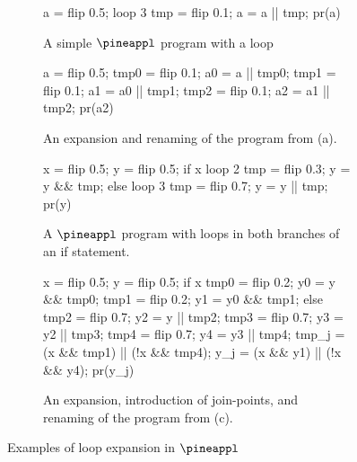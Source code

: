 \begin{figure}
  \begin{subfigure}[t]{0.45\textwidth}
    \begin{pineapplcodeblock}
      a = flip 0.5;
      loop 3 {
        tmp = flip 0.1;
        a = a || tmp; 
      }
      pr(a)
    \end{pineapplcodeblock}
    \caption{A simple $\pineappl$ program with a loop}
    \label{fig:loop-pineappl-sugar}
  \end{subfigure}
  \begin{subfigure}[t]{0.45\textwidth}
    \begin{pineapplcodeblock}
      a = flip 0.5;
      tmp0 = flip 0.1;
      a0 = a || tmp0; 
      tmp1 = flip 0.1;
      a1 = a0 || tmp1;
      tmp2 = flip 0.1;
      a2 = a1 || tmp2;
      pr(a2)
    \end{pineapplcodeblock}
    \caption{An expansion and renaming of the program from (a).}
    \label{fig:loop-pineappl-desugar}
  \end{subfigure}
  \begin{subfigure}[t]{0.45\textwidth}
    \begin{pineapplcodeblock}
      x = flip 0.5;
      y = flip 0.5;
      if x {
        loop 2 {
          tmp = flip 0.3;
          y = y && tmp;
        }
      }
      else {
        loop 3 {
          tmp = flip 0.7;
          y = y || tmp; 
        }
      }
      pr(y)
    \end{pineapplcodeblock}
    \caption{A $\pineappl$ program with loops in both branches of an if statement.}
    \label{fig:loop-pineappl-ite-sugar}
  \end{subfigure}
  \begin{subfigure}[t]{0.45\textwidth}
    \begin{pineapplcodeblock}
      x = flip 0.5;
      y = flip 0.5;
      if x {
        tmp0 = flip 0.2;
        y0 = y && tmp0;
        tmp1 = flip 0.2;
        y1 = y0 && tmp1;
      }
      else {
        tmp2 = flip 0.7;
        y2 = y || tmp2;
        tmp3 = flip 0.7;
        y3 = y2 || tmp3;
        tmp4 = flip 0.7;
        y4 = y3 || tmp4;
      }
      tmp_j = (x && tmp1) || (!x && tmp4);
      y_j = (x && y1) || (!x && y4);
      pr(y_j)
    \end{pineapplcodeblock}
    \caption{An expansion, introduction of join-points, and renaming of the program
    from (c).}
    \label{fig:loop-pineappl-ite-desugar}
\end{subfigure}
\caption{Examples of loop expansion in $\pineappl$}
\label{fig:loop-pineappl}
\end{figure}


